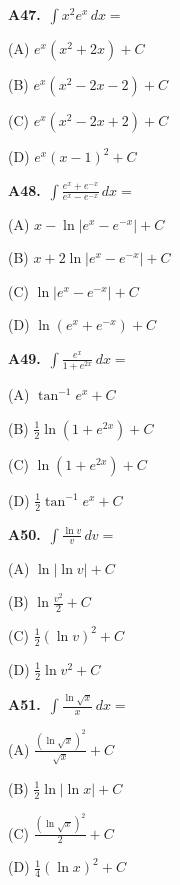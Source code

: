 \documentclass[11pt]{article}
\begin{document}
\bigskip\noindent\textbf{A47.}\ $\displaystyle\int x^2e^x\,dx=$
\begin{list}{}{\setlength{\leftmargin}{3em}\setlength{\labelwidth}{2.5em}\setlength{\itemsep}{0pt}\setlength{\topsep}{2pt}}
\item[(A)] $e^x(x^2+2x)+C$
\item[(B)] $e^x(x^2-2x-2)+C$
\item[(C)] $e^x(x^2-2x+2)+C$
\item[(D)] $e^x(x-1)^2+C$
\end{list}

\bigskip\noindent\textbf{A48.}\ $\displaystyle\int \frac{e^x+e^{-x}}{e^x-e^{-x}}\,dx=$
\begin{list}{}{\setlength{\leftmargin}{3em}\setlength{\labelwidth}{2.5em}\setlength{\itemsep}{0pt}\setlength{\topsep}{2pt}}
\item[(A)] $x-\ln\lvert e^x-e^{-x}\rvert+C$
\item[(B)] $x+2\ln\lvert e^x-e^{-x}\rvert+C$
\item[(C)] $\ln\lvert e^x-e^{-x}\rvert+C$
\item[(D)] $\ln(e^x+e^{-x})+C$
\end{list}

\bigskip\noindent\textbf{A49.}\ $\displaystyle\int \frac{e^x}{1+e^{2x}}\,dx=$
\begin{list}{}{\setlength{\leftmargin}{3em}\setlength{\labelwidth}{2.5em}\setlength{\itemsep}{0pt}\setlength{\topsep}{2pt}}
\item[(A)] $\tan^{-1}e^x+C$
\item[(B)] $\frac12\ln(1+e^{2x})+C$
\item[(C)] $\ln(1+e^{2x})+C$
\item[(D)] $\frac12\tan^{-1}e^x+C$
\end{list}

\bigskip\noindent\textbf{A50.}\ $\displaystyle\int \frac{\ln v}v\,dv=$
\begin{list}{}{\setlength{\leftmargin}{3em}\setlength{\labelwidth}{2.5em}\setlength{\itemsep}{0pt}\setlength{\topsep}{2pt}}
\item[(A)] $\ln\lvert\ln v\rvert+C$
\item[(B)] $\ln\frac{v^2}2+C$
\item[(C)] $\frac12(\ln v)^2+C$
\item[(D)] $\frac12\ln v^2+C$
\end{list}

\bigskip\noindent\textbf{A51.}\ $\displaystyle\int \frac{\ln\sqrt x}x\,dx=$
\begin{list}{}{\setlength{\leftmargin}{3em}\setlength{\labelwidth}{2.5em}\setlength{\itemsep}{0pt}\setlength{\topsep}{2pt}}
\item[(A)] $\frac{(\ln\sqrt x)^2}{\sqrt x}+C$
\item[(B)] $\frac12\ln\lvert\ln x\rvert+C$
\item[(C)] $\frac{(\ln\sqrt x)^2}2+C$
\item[(D)] $\frac14(\ln x)^2+C$
\end{list}
\end{document}
